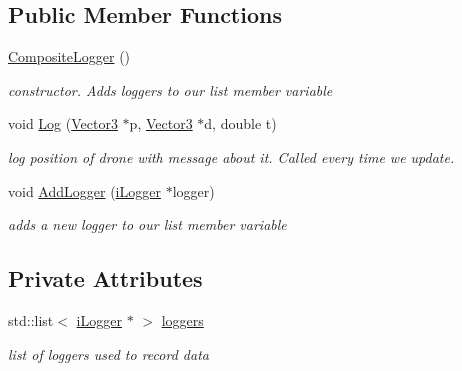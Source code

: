 \subsection*{Public Member Functions}
\begin{DoxyCompactItemize}
\item 
\mbox{\label{classCompositeLogger_a10914598defb8bd5ab057508c831a031}} 
\hyperlink{classCompositeLogger_a10914598defb8bd5ab057508c831a031}{Composite\+Logger} ()
\begin{DoxyCompactList}\small\item\em constructor. Adds loggers to our list member variable \end{DoxyCompactList}\item 
\mbox{\label{classCompositeLogger_a84c0c034a72ddc1c7eeb3cfc47d1dcd5}} 
void \hyperlink{classCompositeLogger_a84c0c034a72ddc1c7eeb3cfc47d1dcd5}{Log} (\hyperlink{classVector3}{Vector3} $\ast$p, \hyperlink{classVector3}{Vector3} $\ast$d, double t)
\begin{DoxyCompactList}\small\item\em log position of drone with message about it. Called every time we update. \end{DoxyCompactList}\item 
\mbox{\label{classCompositeLogger_a8548bd7dc7fbba8627b7a760a1022867}} 
void \hyperlink{classCompositeLogger_a8548bd7dc7fbba8627b7a760a1022867}{Add\+Logger} (\hyperlink{classiLogger}{i\+Logger} $\ast$logger)
\begin{DoxyCompactList}\small\item\em adds a new logger to our list member variable \end{DoxyCompactList}\end{DoxyCompactItemize}
\subsection*{Private Attributes}
\begin{DoxyCompactItemize}
\item 
\mbox{\label{classCompositeLogger_a7a74921303ccdead873c982e1a3ca59f}} 
std\+::list$<$ \hyperlink{classiLogger}{i\+Logger} $\ast$ $>$ \hyperlink{classCompositeLogger_a7a74921303ccdead873c982e1a3ca59f}{loggers}
\begin{DoxyCompactList}\small\item\em list of loggers used to record data \end{DoxyCompactList}\end{DoxyCompactItemize}


